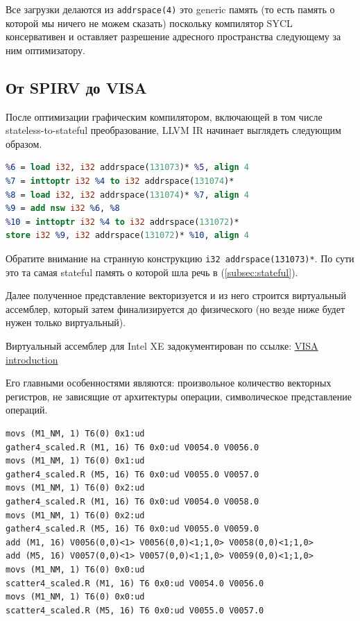 \documentclass[a4paper,12pt,oneside]{article}
\begin{document}
Все загрузки делаются из \lstinline!addrspace(4)! это generic память (то есть память о которой мы ничего не можем сказать) поскольку компилятор SYCL консервативен и оставляет разрешение адресного пространства следующему за ним оптимизатору.

\subsection{От SPIRV до VISA}\label{subsec:igc}

После оптимизации графическим компилятором, включающей в том числе stateless-to-stateful преобразование, LLVM IR начинает выглядеть следующим образом.

\begin{lstlisting}[language=llvm,caption={Сложение векторов: device IR после компилятора IGC},label={lst:syclvaddigc}]
%5 = inttoptr i32 %4 to i32 addrspace(131073)*
%6 = load i32, i32 addrspace(131073)* %5, align 4
%7 = inttoptr i32 %4 to i32 addrspace(131074)*
%8 = load i32, i32 addrspace(131074)* %7, align 4
%9 = add nsw i32 %6, %8
%10 = inttoptr i32 %4 to i32 addrspace(131072)*
store i32 %9, i32 addrspace(131072)* %10, align 4
\end{lstlisting}

Обратите внимание на странную конструкцию \lstinline!i32 addrspace(131073)*!. По сути это та самая stateful память о которой шла речь в (\ref{subsec:stateful}).

Далее полученное представление векторизуется и из него строится виртуальный ассемблер, который затем финализируется до физического (но везде ниже будет нужен только виртуальный).

Виртуальный ассемблер для Intel XE задокументирован по ссылке:
\href{https://github.com/intel/intel-graphics-compiler/blob/master/documentation/visa/1_introduction.md}{VISA introduction}

Его главными особенностями являются: произвольное количество векторных регистров, не зависящие от архитектуры операции, символическое представление операций.

\begin{lstlisting}[language={[x86masm]Assembler},caption={Сложение векторов: VISA ассемблер},label={lst:syclvaddvisa}]
movs (M1_NM, 1) T6(0) 0x1:ud
gather4_scaled.R (M1, 16) T6 0x0:ud V0054.0 V0056.0
movs (M1_NM, 1) T6(0) 0x1:ud
gather4_scaled.R (M5, 16) T6 0x0:ud V0055.0 V0057.0
movs (M1_NM, 1) T6(0) 0x2:ud
gather4_scaled.R (M1, 16) T6 0x0:ud V0054.0 V0058.0
movs (M1_NM, 1) T6(0) 0x2:ud
gather4_scaled.R (M5, 16) T6 0x0:ud V0055.0 V0059.0
add (M1, 16) V0056(0,0)<1> V0056(0,0)<1;1,0> V0058(0,0)<1;1,0>
add (M5, 16) V0057(0,0)<1> V0057(0,0)<1;1,0> V0059(0,0)<1;1,0>
movs (M1_NM, 1) T6(0) 0x0:ud
scatter4_scaled.R (M1, 16) T6 0x0:ud V0054.0 V0056.0
movs (M1_NM, 1) T6(0) 0x0:ud
scatter4_scaled.R (M5, 16) T6 0x0:ud V0055.0 V0057.0
\end{lstlisting}
\end{document}
